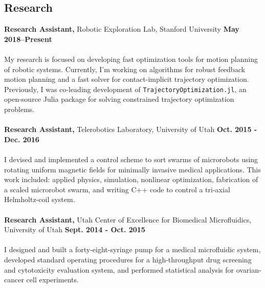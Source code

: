\documentclass[margin,line]{res}
\begin{document}
\begin{resume}
\section{\sc Research}
{\bf Research Assistant,} Robotic Exploration Lab, Stanford University
\hfill {\bf May 2018--Present}\\
\\
My research is focused on developing fast optimization tools for motion planning of robotic systems. Currently, I'm working on algorithms for robust feedback motion planning and a fast solver for contact-implicit trajectory optimization. Previously, I was co-leading development of \texttt{TrajectoryOptimization.jl}, an open-source Julia package for solving constrained trajectory optimization problems. \\
\\
{\bf Research Assistant,} Telerobotics Laboratory, University of Utah
\hfill {\bf Oct. 2015 - Dec. 2016}\\
\\
I devised and implemented a control scheme to sort swarms of microrobots using rotating uniform
magnetic fields for minimally invasive medical applications. This work included: applied physics, simulation, nonlinear optimization, fabrication of a scaled microrobot swarm, and writing C++ code to control a tri-axial Helmholtz-coil system.\\
\\
{\bf Research Assistant,} Utah Center of Excellence for Biomedical Microfluidics, University of Utah
\hfill {\bf Sept. 2014 - Oct. 2015}\\
\\
I designed and built a forty-eight-syringe pump for a medical microfluidic system, developed standard operating procedures for a high-throughput drug screening and cytotoxicity evaluation system, and performed statistical analysis for ovarian-cancer cell experiments.\\


\end{resume}
\end{document}
